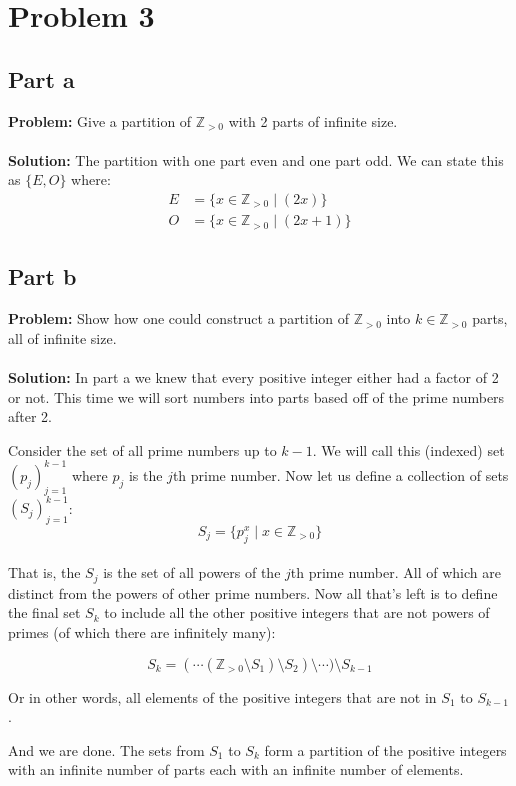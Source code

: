 \documentclass{article}
\begin{document}
\section{Problem 3}
\subsection{Part a}
\textbf{Problem:} Give a partition of $\mathbb{Z}_{>0}$ with 2 parts of infinite size.
\\\\
\textbf{Solution:} The partition with one part even and one part odd. We can state this as $\{E,O\}$ where:
\begin{align*}
E&=\{x\in\mathbb{Z}_{>0}\mid (2x)\}\\
O&=\{x\in\mathbb{Z}_{>0}\mid (2x+1)\}
\end{align*}

\subsection{Part b}
\textbf{Problem:} Show how one could construct a partition of $\mathbb{Z}_{>0}$ into $k\in\mathbb{Z}_{>0}$ parts, all of infinite size.
\\\\
\textbf{Solution:} In part a we knew that every positive integer either had a factor of 2 or not. This time we will sort numbers into parts based off of the prime numbers after 2.

Consider the set of all prime numbers up to $k-1$. We will call this (indexed) set $(p_j)_{j=1}^{k-1}$ where $p_j$ is the $j$th prime number. Now let us define a collection of sets $(S_j)_{j=1}^{k-1}$:
$$S_j=\{p_j^x\mid x\in\mathbb{Z}_{>0}\}$$
\\
\indent That is, the $S_j$ is the set of all powers of the $j$th prime number. All of which are distinct from the powers of other prime numbers. Now all that's left is to define the final set $S_k$ to include all the other positive integers that are not powers of primes (of which there are infinitely many):

$$S_k=(\cdots(\mathbb{Z}_{>0}\setminus S_1)\setminus S_2)\setminus\cdots)\setminus S_{k-1}$$

Or in other words, all elements of the positive integers that are not in $S_1$ to $S_{k-1}$.

And we are done. The sets from $S_1$ to $S_k$ form a partition of the positive integers with an infinite number of parts each with an infinite number of elements.
\end{document}
